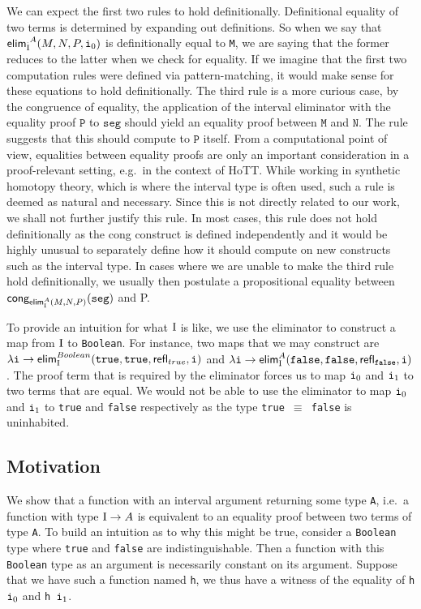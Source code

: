 \documentclass[12pt,twoside,maitrise]{dms}
\theoremstyle{definition}
\numberwithin{equation}{section}
\numberwithin{table}{chapter}
\numberwithin{figure}{chapter}
\newcommand\kw[1] {\textsf{#1}}
\newcommand\id[1] {\texttt{#1}}
\newcommand\fn[1] {\texttt{#1}}
\begin{document}
We can expect the first two rules to hold definitionally. Definitional equality
of two terms is determined by expanding out definitions. So when we say that
$\kw{elim}_{\bI}^{_.A}(M, N , P, \ileft)$ is definitionally equal to \id{M}, we
are saying that the former reduces to the latter when we check for equality. If
we imagine that the first two computation rules were defined via
pattern-matching, it would make sense for these equations to hold
definitionally. The third rule is a more curious case, by the congruence of
equality, the application of the interval eliminator with the equality proof
$\id{P}$ to $\id{seg}$ should yield an equality proof between $\id{M}$ and
$\id{N}$. The rule suggests that this should compute to $\id{P}$ itself. From a
computational point of view, equalities between equality proofs are only an
important consideration in a proof-relevant setting, e.g.\ in the context of
HoTT\@. While working in synthetic homotopy theory, which is where the interval
type is often used, such a rule is deemed as natural and necessary. Since this
is not directly related to our work, we shall not further justify this rule. In
most cases, this rule does not hold definitionally as the \kw{cong} construct is
defined independently and it would be highly unusual to separately define how it
should compute on new constructs such as the interval type. In cases where we
are unable to make the third rule hold definitionally, we usually then postulate
a propositional equality between $\kw{cong}_{\kw{elim}_{\bI}^{A}(M, N,
  P)}(\id{seg})$ and P.

To provide an intuition for what $\mathrm{I}$ is like, we use the eliminator to
construct a map from $\mathrm{I}$ to \id{Boolean}. For instance, two maps that we may
construct are $\lambda \id{i} \rightarrow \kw{elim}_{\bI}^{Boolean}(\id{true},
\id{true}, \kw{refl}_{true}, \id{i})$ and $\lambda \id{i} \rightarrow
\kw{elim}_{\bI}^{A}(\id{false}, \id{false}, \kw{refl}_{\id{false}}, \id{i})$.
The proof term that is required by the eliminator forces us to map $\ileft$ and
$\iright$ to two terms that are equal. We would not be able to use the
eliminator to map $\ileft$ and $\iright$ to \id{true} and \id{false}
respectively as the type \fn{true $\equiv$ false} is uninhabited.

\subsection{Motivation}
We show that a function with an interval argument returning some type \id{A},
i.e.\ a function with type \fn{$\mathrm{I} \rightarrow A$} is equivalent to an equality
proof between two terms of type \id{A}. To build an intuition as to why this
might be true, consider a \id{Boolean} type where \id{true} and \id{false} are
indistinguishable. Then a function with this \id{Boolean} type as an argument is
necessarily constant on its argument. Suppose that we have such a function named
\id{h}, we thus have a witness of the equality of \fn{h $\ileft$} and \fn{h
  $\iright$}.
\end{document}
